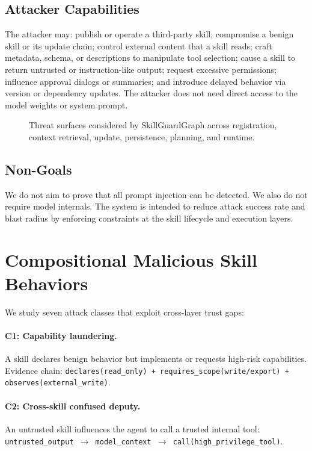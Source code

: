\documentclass[10pt]{article}
\begin{document}
\subsection{Attacker Capabilities}

The attacker may: publish or operate a third-party skill; compromise a benign skill or its update chain; control external content that a skill reads; craft metadata, schema, or descriptions to manipulate tool selection; cause a skill to return untrusted or instruction-like output; request excessive permissions; influence approval dialogs or summaries; and introduce delayed behavior via version or dependency updates. The attacker does not need direct access to the model weights or system prompt.

\begin{figure}[t]
\centering

\caption{Threat surfaces considered by SkillGuardGraph across registration, context retrieval, update, persistence, planning, and runtime.}
\label{fig:threat_model}
\end{figure}

\subsection{Non-Goals}

We do not aim to prove that all prompt injection can be detected. We also do not require model internals. The system is intended to reduce attack success rate and blast radius by enforcing constraints at the skill lifecycle and execution layers.

\section{Compositional Malicious Skill Behaviors}
\label{sec:taxonomy}

We study seven attack classes that exploit cross-layer trust gaps:

\paragraph{C1: Capability laundering.}
A skill declares benign behavior but implements or requests high-risk capabilities. Evidence chain: \texttt{declares(read\_only) + requires\_scope(write/export) + observes(external\_write)}.

\paragraph{C2: Cross-skill confused deputy.}
An untrusted skill influences the agent to call a trusted internal tool: \texttt{untrusted\_output $\rightarrow$ model\_context $\rightarrow$ call(high\_privilege\_tool)}.
\end{document}
